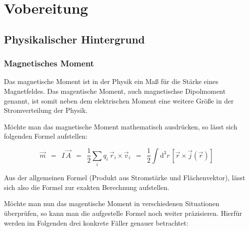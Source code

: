 \documentclass{article}
\newcommand{\widespace}{\enspace}
\newcommand{\wideeq}{\widespace = \widespace}
\begin{document}
\newpage


\section{Vobereitung}

\subsection{Physikalischer Hintergrund}

\subsubsection{Magnetisches Moment}

\cite{chemie.de}

Das magnetische Moment ist in der Physik ein Maß für die Stärke eines Magnetfeldes. Das magentische Moment, auch magnetischse Dipolmoment genannt, ist somit neben dem elektrischen Moment eine weitere Größe in der Stromverteilung der Physik.

Möchte man das magnetische Moment mathematisch ausdrücken, so lässt sich folgenden Formel aufstellen:

\[
    \vec{m} \wideeq I \, \vec{A}
    \wideeq \frac{1}{2} \sum_i q_i \, \vec{r}_i \times \vec{v}_i
    \wideeq \frac{1}{2} \int \mathrm{d}^3 r \,
    \left[ \vec r \times \vec j (\vec r) \right]
\]

Aus der allgemeinen Formel (Produkt aus Stromstärke und Flächenvektor), lässt sich also die Formel zur exakten Berechnung aufstellen.

Möchte man nun das magentische Moment in verschiedenen Situationen überprüfen, so kann man die aufgestelle Formel noch weiter präzisieren. Hierfür werden im Folgenden drei konkrete Fäller genauer betrachtet:
\end{document}
